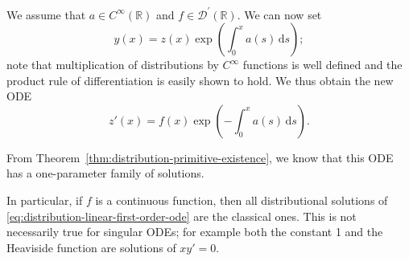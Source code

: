 We assume that $a\in C^\infty(\mathbb{R})$ and $f\in\mathcal{D}^{\prime}(\mathbb{R})$. We can now set
\begin{equation}\label{eq:distribution-ode-integrating-factor-substitution}
y(x)=z(x)\exp\left(\int_0^xa(s)\,\mathrm{d}s\right);
\end{equation}
note that multiplication of distributions by $C^\infty$ functions is well defined and the product rule of differentiation is easily shown to hold. We thus obtain the new ODE
\begin{equation}\label{eq:distribution-ode-primitive-reduction}
z'(x)=f(x)\exp\left(-\int_0^xa(s)\,\mathrm{d}s\right).
\end{equation}


From Theorem~\ref{thm:distribution-primitive-existence}, we know that this ODE has a one-parameter family of solutions.

In particular, if $f$ is a continuous function, then all distributional solutions of \eqref{eq:distribution-linear-first-order-ode} are the classical ones. This is not necessarily true for singular ODEs; for example both the constant 1 and the Heaviside function are solutions of $xy'=0$.
